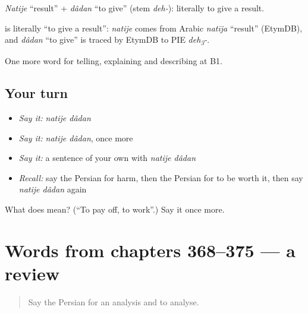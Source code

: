 \emph{Natije} \textquotedblleft{}result\textquotedblright{} + \emph{dâdan} \textquotedblleft{}to give\textquotedblright{} (stem \emph{deh-}): literally to give a result.

\begin{cousinweb}
\textbf{ } is literally \textquotedblleft{}to give a result\textquotedblright{}: \emph{natije} comes from Arabic \emph{natīja} \textquotedblleft{}result\textquotedblright{} (EtymDB), and \emph{dâdan} \textquotedblleft{}to give\textquotedblright{} is traced by EtymDB to PIE \emph{deh\textsubscript{3}-}.
\end{cousinweb}

\begin{grammarlens}[title={What you've built}]
One more word for telling, explaining and describing at B1.
\end{grammarlens}

\subsection*{Your turn}
\begin{itemize}
\raggedright
  \item \emph{Say it:} \emph{natije dâdan}
  \item \emph{Say it:} \emph{natije dâdan}, once more
  \item \emph{Say it:} a sentence of your own with \emph{natije dâdan}
  \item \emph{Recall:} say the Persian for harm, then the Persian for to be worth it, then say \emph{natije dâdan} again
\end{itemize}

\begin{tcolorbox}[breakable,colback=teal!4,colframe=teal!35!black,title={Before you move on}]
What does   mean? (\textquotedblleft{}To pay off, to work\textquotedblright{}.) Say it once more.
\end{tcolorbox}
\section[(dialogue)]{Words from chapters 368–375 — a review}

\label{lesson:FA-R375-review-368-375}



\begin{quote}
Say the Persian for an analysis and to analyse.
\end{quote}


